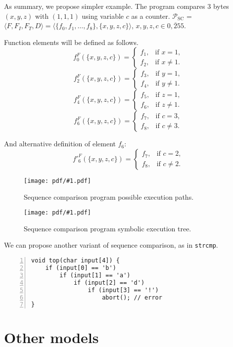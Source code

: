 \documentclass[oneside,a4]{article}  %
\newcommand{\level}{\section}
\newcommand{\centerimage}[2]{
\begin{figure}[h!]
    \begin{center}
        \texttt{[image: pdf/\#1.pdf]}
        \caption{#2}
    \end{center}
    \label{img:#1}
\end{figure}
}
\begin{document}
As summary, we propose simpler example.
The program compares 3 bytes $(x, y, z)$ with $(1, 1, 1)$ using
variable $c$ as a counter.
$\mathcal{P}_{\text{SC}}$ = $\langle F, F_I, F_T, D \rangle =
    \langle \{f_0, f_1, \dots, f_8\},
    \{x, y, z, c\} \rangle$,
$x, y, z, c \in \overline{0, 255}$.

Function elements will be defined as follows.
\[ f_0^F(\{x, y, z, c\}) =
    \begin{cases}
        f_1, & \text{if }x = 1, \\
        f_2, & \text{if }x \neq 1.
    \end{cases} \]
\[ f_2^F(\{x, y, z, c\}) =
    \begin{cases}
        f_3, & \text{if }y = 1, \\
        f_4, & \text{if }y \neq 1.
    \end{cases} \]
\[ f_4^F(\{x, y, z, c\}) =
    \begin{cases}
        f_5, & \text{if }z = 1, \\
        f_6, & \text{if }z \neq 1.
    \end{cases} \]
\[ f_6^F(\{x, y, z, c\}) =
    \begin{cases}
        f_7, & \text{if }c = 3, \\
        f_8, & \text{if }c \neq 3.
    \end{cases} \]

And alternative definition of element $f_6$:
\[ f'_6^F(\{x, y, z, c\}) =
    \begin{cases}
        f_7, & \text{if }c = 2, \\
        f_8, & \text{if }c \neq 2.
    \end{cases} \]

\centerimage{classic_paths}
    {Sequence comparison program possible execution paths.}

\centerimage{classic_symbolic_tree}
    {Sequence comparison program symbolic execution tree.}

We can propose another variant of sequence comparison, as in \texttt{strcmp}.
\begin{lstlisting}[numbers=left,numberstyle=\scriptsize]
void top(char input[4]) {
    if (input[0] == 'b')
        if (input[1] == 'a')
            if (input[2] == 'd')
                if (input[3] == '!')
                    abort(); // error
}
\end{lstlisting}

\level{Other models}
\end{document}
